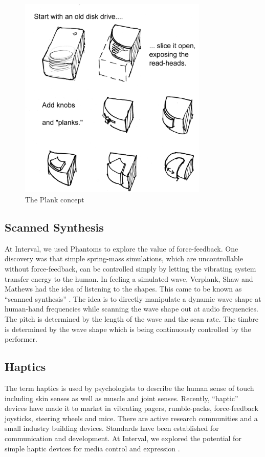 \begin{figure}[ht]
\includegraphics[width=9cm]{Plank1}
\centering

%
\caption{The Plank concept}
\label{Verplank:fig:1}       %
\end{figure}


\subsection{Scanned Synthesis}
\label{Verplank:sub:1_1}
At Interval, we used Phantoms \cite{Massie:1994} to explore the value of force-feedback. One discovery was that simple spring-mass simulations, which are uncontrollable without force-feedback, can be controlled simply by letting the vibrating system transfer energy to the human. In feeling a simulated wave, Verplank, Shaw and Mathews had the idea of listening to the shapes. This came to be known as ``scanned synthesis'' \cite{Verplank:2000}. The idea is to directly manipulate a dynamic wave shape at human-hand frequencies while scanning the wave shape out at audio frequencies. The pitch is determined by the length of the wave and the scan rate. The timbre is determined by the wave shape which is being continuously controlled by the performer.

\subsection{Haptics}
\label{Verplank:sub:1_2}
The term haptics is used by psychologists to describe the human sense of touch including skin senses as well as muscle and joint senses. Recently, ``haptic'' devices have made it to market in vibrating pagers, rumble-packs, force-feedback joysticks, steering wheels and mice. There are active research communities and a small industry building devices. Standards have been established for communication and development. At Interval, we explored the potential for simple haptic devices for media control and expression \cite{Snibbe:2001}.

